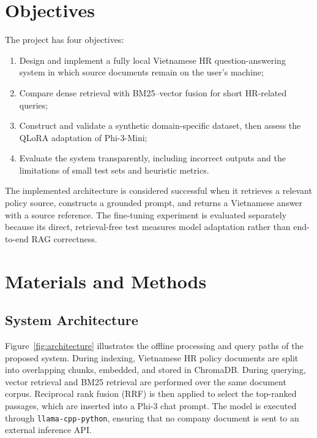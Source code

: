 \documentclass[12pt,a4paper,oneside]{report}
\begin{document}
\chapter{Objectives}

The project has four objectives:
\begin{enumerate}[leftmargin=1.2cm,itemsep=3pt]
  \item Design and implement a fully local Vietnamese HR question-answering
        system in which source documents remain on the user's machine;
  \item Compare dense retrieval with BM25--vector fusion for short HR-related
        queries;
  \item Construct and validate a synthetic domain-specific dataset, then assess
        the QLoRA adaptation of Phi-3-Mini;
  \item Evaluate the system transparently, including incorrect outputs and the
        limitations of small test sets and heuristic metrics.
\end{enumerate}

The implemented architecture is considered successful when it retrieves a
relevant policy source, constructs a grounded prompt, and returns a Vietnamese
answer with a source reference. The fine-tuning experiment is evaluated
separately because its direct, retrieval-free test measures model adaptation
rather than end-to-end RAG correctness.

\chapter{Materials and Methods}

\section{System Architecture}
Figure~\ref{fig:architecture} illustrates the offline processing and query paths
of the proposed system. During indexing, Vietnamese HR policy documents are
split into overlapping chunks, embedded, and stored in ChromaDB. During
querying, vector retrieval and BM25 retrieval are performed over the same
document corpus. Reciprocal rank fusion (RRF) is then applied to select the
top-ranked passages, which are inserted into a Phi-3 chat prompt. The model is
executed through \texttt{llama-cpp-python}, ensuring that no company document is
sent to an external inference API.
\end{document}

